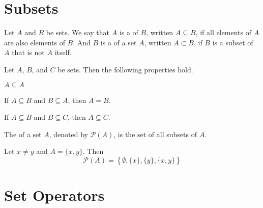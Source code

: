 \section{Subsets}

\begin{defn}
Let $A$ and $B$ be sets.
We say that $A$ is a  of $B$, written $A\subseteq B$,
if all elements of $A$ are also elements of $B$.
And $B$ is a  of a set $A$, written $A\subset B$,
if $B$ is a subset of $A$ that is not $A$ itself.
\end{defn}


\begin{prop}
Let $A$, $B$, and $C$ be sets.
Then the following properties hold.
\begin{myEnum}
\item $A\subseteq A$
\item If $A\subseteq B$ and $B\subseteq A$, then $A=B$.
\item If $A\subseteq B$ and $B\subseteq C$, then $A\subseteq C$.
\end{myEnum}
\end{prop}


\begin{defn}
The  of a set $A$, denoted by $\mathcal{P}(A)$, is the set of all subsets of $A$.
\end{defn}


\begin{eg}
Let $x\neq y$ and $A=\{x,y\}$. Then
\[
\mathcal{P}(A)=\left\{\emptyset,\{x\}, \{y\}, \{x,y\}\right\}
\]
\end{eg}



\section{Set Operators}

